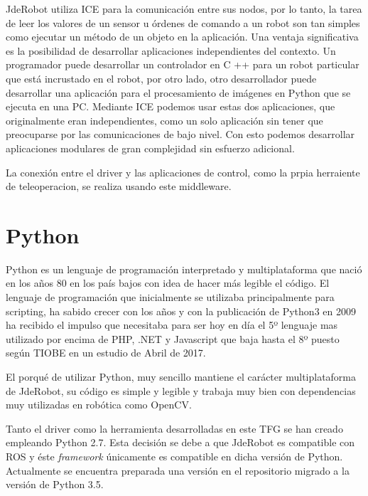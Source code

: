 JdeRobot utiliza ICE para la comunicación entre sus nodos, por lo tanto, la tarea de leer
los valores de un sensor u órdenes de comando a un robot son tan simples como ejecutar un método de un objeto en la aplicación. Una ventaja significativa es la posibilidad de desarrollar aplicaciones independientes del contexto. Un programador puede desarrollar un controlador en C ++ para un robot particular que está incrustado en el robot, por otro lado, otro desarrollador puede desarrollar una aplicación para el procesamiento de imágenes en Python que se ejecuta en una PC. Mediante ICE podemos usar estas dos aplicaciones, que originalmente eran independientes, como un solo aplicación sin tener que preocuparse por las comunicaciones de bajo nivel. Con esto podemos desarrollar aplicaciones modulares de gran complejidad sin esfuerzo adicional.

La conexión entre el driver y las aplicaciones de control, como la prpia herraiente de teleoperacion, se realiza usando este middleware.

\section{Python}
\label{sec:python}

Python es un lenguaje de programaci\'on interpretado y multiplataforma que naci\'o en los años 80 en los país bajos con idea de hacer más legible el c\'odigo.
El lenguaje de programaci\'on que inicialmente se utilizaba principalmente para scripting, ha sabido crecer con los años y con la publicaci\'on de Python3 en 2009 ha recibido el impulso que necesitaba para ser hoy en día el 5º lenguaje mas utilizado por encima de PHP, .NET y Javascript que baja hasta el 8º puesto según TIOBE en un estudio de Abril de 2017.

El porqué de utilizar Python, muy sencillo mantiene el carácter multiplataforma de JdeRobot, su c\'odigo es simple y legible y trabaja muy bien con dependencias muy utilizadas en rob\'otica como OpenCV.

Tanto el driver como la herramienta desarrolladas en este TFG se han creado empleando Python 2.7. Esta decisión se debe a que JdeRobot es compatible con ROS y éste \textit{framework} únicamente es compatible en dicha versión de Python. Actualmente se encuentra preparada una versión en el repositorio migrado a la versión de Python 3.5.

\cleardoublepage